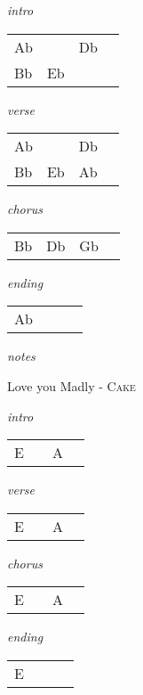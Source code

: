 \documentclass[12pt]{article}
\begin{document}
\huge
\textit{intro}

\begin{tabular}{|P{1.25in}|P{1.25in}|P{1.25in}|P{1.25in}|}
  Ab &     & Db  &   \\
  Bb & Eb  &
\end{tabular}

\textit{verse}

\begin{tabular}{|P{1.25in}|P{1.25in}|P{1.25in}|P{1.25in}|}
  Ab &   &  Db &   \\
  Bb  & Eb  & Ab &  \\
\end{tabular}

\textit{chorus}

\begin{tabular}{|P{1.25in}|P{1.25in}|P{1.25in}|P{1.25in}|}
  Bb & Db  & Gb  &   \\
\end{tabular}

\textit{ending}

\begin{tabular}{|P{1.25in}|P{1.25in}|P{1.25in}|P{1.25in}|}
  Ab &   &   &   \\
\end{tabular}

\textit{notes}

\newpage

{\Huge Love you Madly} {\huge - \textsc{Cake}}

\huge
\textit{intro}

\begin{tabular}{|P{1.25in}|P{1.25in}|P{1.25in}|P{1.25in}|}
  E &   & A  &   \\
\end{tabular}

\textit{verse}

\begin{tabular}{|P{1.25in}|P{1.25in}|P{1.25in}|P{1.25in}|}
  E &   & A  &   \\
\end{tabular}

\textit{chorus}

\begin{tabular}{|P{1.25in}|P{1.25in}|P{1.25in}|P{1.25in}|}
  E &   & A  &   \\
\end{tabular}

\textit{ending}

\begin{tabular}{|P{1.25in}|P{1.25in}|P{1.25in}|P{1.25in}|}
  E &   &   &   \\
\end{tabular}
\end{document}
